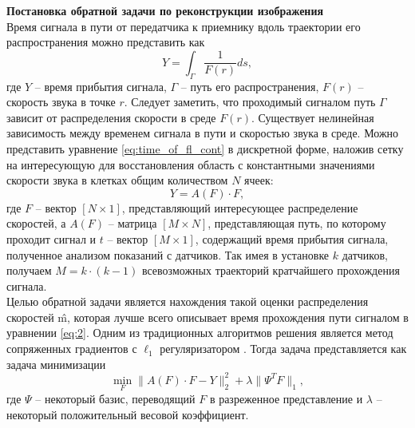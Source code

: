 \documentclass[14pt]{matmex-diploma}
\begin{document}
\textbf{Постановка обратной задачи по реконструкции изображения}\\
Время сигнала в пути от передатчика к приемнику вдоль траектории его распространения можно представить как 
\begin{equation}\label{eq:time_of_fl_cont}
Y = \int_\Gamma \frac{1}{F(r)}ds,
\end{equation}
где $Y$ -- время прибытия сигнала, $\Gamma$ -- путь его распространения, $F(r)$ -- скорость звука в точке $r$. Следует заметить, что проходимый сигналом путь $\Gamma$ зависит от распределения скорости в среде $F(r)$. Существует нелинейная зависимость между временем сигнала в пути и скоростью звука в среде. Можно представить уравнение \eqref{eq:time_of_fl_cont} в дискретной форме, наложив сетку на интересующую для восстановления область с константными значениями скорости звука в клетках общим количеством $N$ ячеек:
\begin{equation}\label{eq:2}
Y = A(F)\cdot F,
\end{equation}
где $F$ -- вектор $[N\times 1]$, представляющий интересующее распределение скоростей, а $A(F)$ -- матрица $[M\times N]$, представляющая путь, по которому проходит сигнал и $t$ -- вектор $[M\times 1]$, содержащий время прибытия сигнала, полученное анализом показаний с датчиков. Так имея в установке $k$ датчиков, получаем $M = k\cdot (k-1)$ всевозможных траекторий кратчайшего прохождения сигнала. \\
Целью обратной задачи является нахождения такой оценки распределения скоростей \^{m}, которая лучше всего описывает время прохождения пути сигналом в уравнении \eqref{eq:2}. Одним из традиционных алгоритмов решения является метод сопряженных градиентов с $\ell_1$ регуляризатором \cite{hormati2010robust}. Тогда задача представляется как задача минимизации
\begin{equation}
\label{eq:lasso}
\min_F \| A(F) \cdot F - Y \|_2^2 + \lambda \| \Psi^T F \|_1,
\end{equation}
где $\Psi$ -- некоторый базис, переводящий $F$ в разреженное представление и $\lambda$ -- некоторый положительный весовой коэффициент. 
\end{document}
